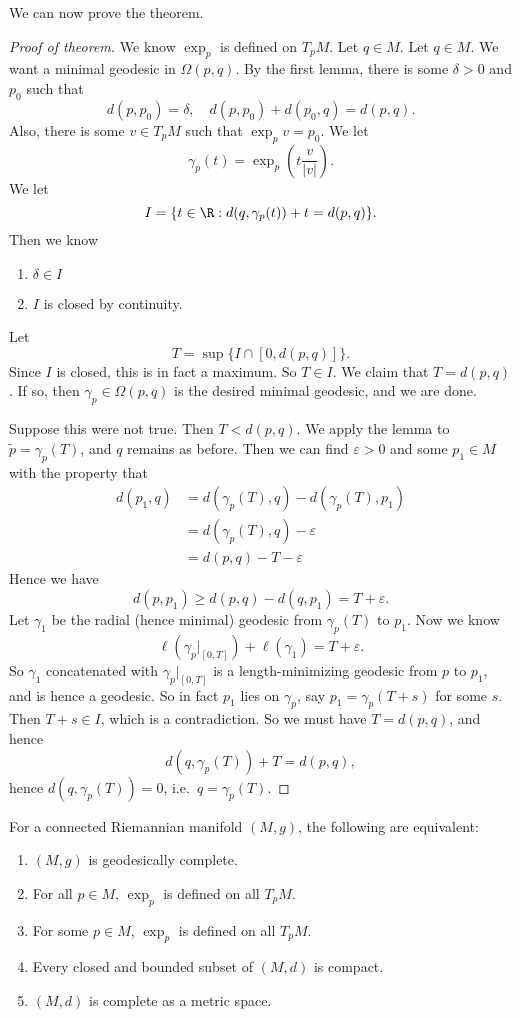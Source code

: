 \documentclass[a4paper]{article}
\begin{document}
We can now prove the theorem.
\begin{proof}[Proof of theorem]
  We know $\exp_p$ is defined on $T_p M$. Let $q \in M$. Let $q \in M$. We want a minimal geodesic in $\Omega(p, q)$. By the first lemma, there is some $\delta > 0$ and $p_0$ such that
  \[
    d(p, p_0) = \delta,\quad d(p, p_0) + d(p_0, q) = d(p, q).
  \]
  Also, there is some $v \in T_p M$ such that $\exp_p v = p_0$. We let
  \[
    \gamma_p (t) = \exp_p\left(t \frac{v}{|v|}\right).
  \]
  We let
  \[
    I = \{t \in \R: d(q, \gamma_p(t)) + t = d(p, q)\}.
  \]
  Then we know
  \begin{enumerate}
    \item $\delta \in I$
    \item $I$ is closed by continuity.
  \end{enumerate}
  Let
  \[
    T = \sup\{I \cap [0, d(p, q)]\}.
  \]
  Since $I$ is closed, this is in fact a maximum. So $T \in I$. We claim that $T = d(p, q)$. If so, then $\gamma_p \in \Omega(p, q)$ is the desired minimal geodesic, and we are done.

  Suppose this were not true. Then $T < d(p, q)$. We apply the lemma to $\tilde{p} = \gamma_p(T)$, and $q$ remains as before. Then we can find $\varepsilon > 0$ and some $p_1 \in M$ with the property that
  \begin{align*}
    d(p_1, q) &= d(\gamma_p(T), q) - d(\gamma_p(T), p_1) \\
    &= d(\gamma_p(T), q) - \varepsilon\\
    &= d(p, q) - T - \varepsilon
  \end{align*}
  Hence we have
  \[
    d(p, p_1) \geq d(p, q) - d(q, p_1) = T + \varepsilon.
  \]
  Let $\gamma_1$ be the radial (hence minimal) geodesic from $\gamma_p(T)$ to $p_1$. Now we know
  \[
    \ell(\gamma_p|_{[0, T]}) + \ell(\gamma_1) = T + \varepsilon.
  \]
  So $\gamma_1$ concatenated with $\gamma_p|_{[0, T]}$ is a length-minimizing geodesic from $p$ to $p_1$, and is hence a geodesic. So in fact $p_1$ lies on $\gamma_p$, say $p_1 = \gamma_p(T + s)$ for some $s$. Then $T + s \in I$, which is a contradiction. So we must have $T = d(p, q)$, and hence
  \[
    d(q, \gamma_p(T)) + T = d(p, q),
  \]
  hence $d(q, \gamma_p(T)) = 0$, i.e.\ $q = \gamma_p(T)$.
\end{proof}

\begin{cor}
  For a connected Riemannian manifold $(M, g)$, the following are equivalent:
  \begin{enumerate}
    \item $(M, g)$ is geodesically complete.
    \item For all $p \in M$, $\exp_p$ is defined on all $T_p M$.
    \item For some $p \in M$, $\exp_p$ is defined on all $T_p M$.
    \item Every closed and bounded subset of $(M, d)$ is compact.
    \item $(M, d)$ is complete as a metric space.
  \end{enumerate}
\end{cor}
\end{document}
